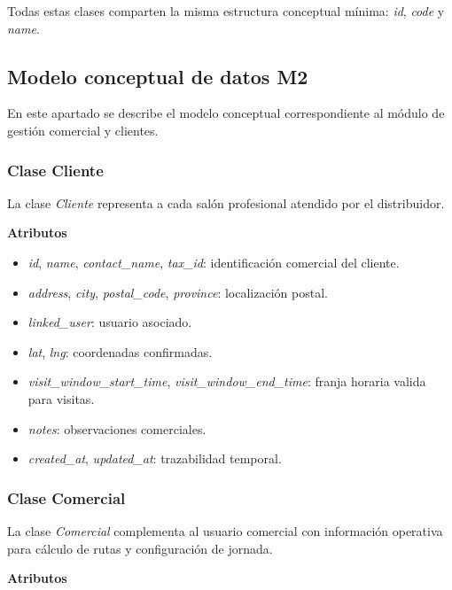 Todas estas clases comparten la misma estructura conceptual mínima: \textit{id}, \textit{code} y \textit{name}.

\subsection{Modelo conceptual de datos M2}

En este apartado se describe el modelo conceptual correspondiente al módulo de gestión comercial y clientes.

\subsubsection{Clase Cliente}

La clase \textit{Cliente} representa a cada salón profesional atendido por el distribuidor.

\textbf{Atributos}

\begin{itemize}
      \item \textit{id}, \textit{name}, \textit{contact\_name}, \textit{tax\_id}: identificación comercial del cliente.
      \item \textit{address}, \textit{city}, \textit{postal\_code}, \textit{province}: localización postal.
      \item \textit{linked\_user}: usuario asociado.
      \item \textit{lat}, \textit{lng}: coordenadas confirmadas.
      \item \textit{visit\_window\_start\_time}, \textit{visit\_window\_end\_time}: franja horaria valida para visitas.
      \item \textit{notes}: observaciones comerciales.
      \item \textit{created\_at}, \textit{updated\_at}: trazabilidad temporal.
\end{itemize}

\subsubsection{Clase Comercial}

La clase \textit{Comercial} complementa al usuario comercial con información operativa para cálculo de rutas y configuración de jornada.

\textbf{Atributos}

